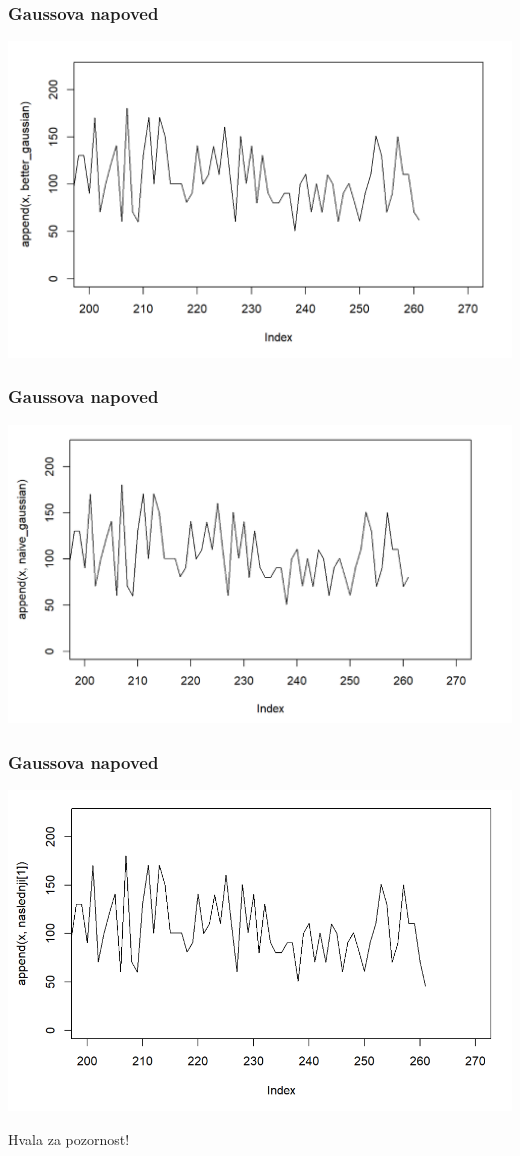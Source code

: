 \documentclass[10pt]{beamer}
\begin{document}
\begin{frame}
\frametitle{Gaussova napoved}
\includegraphics[width=1\textwidth]{betterB.png}
\end{frame}
\begin{frame}
\frametitle{Gaussova napoved}
\includegraphics[width=1\textwidth]{naiveB.png}
\end{frame}
\begin{frame}
\frametitle{Gaussova napoved}
\includegraphics[width=1\textwidth]{naslednjiB.png}
\end{frame}

\begin{frame}
\centering Hvala za pozornost!
\end{frame}
\end{document}
